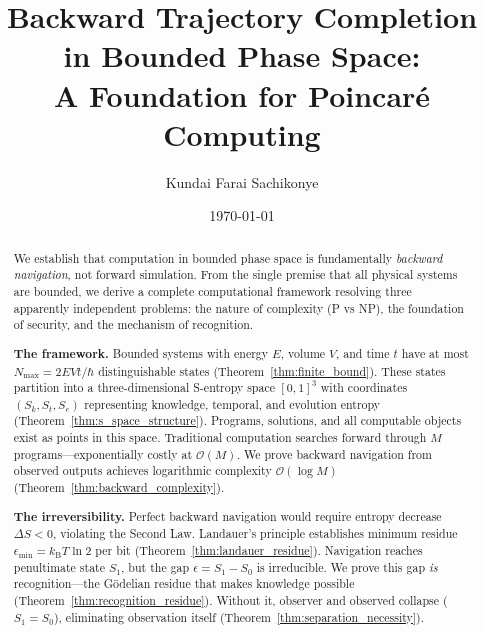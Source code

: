 \documentclass[twocolumn,10pt]{article}
\theoremstyle{definition}
\theoremstyle{remark}
\newcommand{\kB}{k_{\text{B}}}
\newcommand{\Sk}{S_k}
\newcommand{\St}{S_t}
\newcommand{\Se}{S_e}
\newcommand{\bigO}{\mathcal{O}}
\begin{document}
\title{\vspace{-1cm}\textbf{Backward Trajectory Completion in Bounded Phase Space:\\ A Foundation for Poincaré Computing}}

\author[1]{Kundai Farai Sachikonye}

\date{\today}

\maketitle

\begin{abstract}
\noindent We establish that computation in bounded phase space is fundamentally \textit{backward navigation}, not forward simulation. From the single premise that all physical systems are bounded, we derive a complete computational framework resolving three apparently independent problems: the nature of complexity (P vs NP), the foundation of security, and the mechanism of recognition.

\vspace{0.2cm}
\noindent\textbf{The framework.} Bounded systems with energy $E$, volume $V$, and time $t$ have at most $N_{\max} = 2EVt/\hbar$ distinguishable states (Theorem~\ref{thm:finite_bound}). These states partition into a three-dimensional S-entropy space $[0,1]^3$ with coordinates $(\Sk, \St, \Se)$ representing knowledge, temporal, and evolution entropy (Theorem~\ref{thm:s_space_structure}). Programs, solutions, and all computable objects exist as points in this space. Traditional computation searches forward through $M$ programs—exponentially costly at $\bigO(M)$. We prove backward navigation from observed outputs achieves logarithmic complexity $\bigO(\log M)$ (Theorem~\ref{thm:backward_complexity}).

\vspace{0.2cm}
\noindent\textbf{The irreversibility.} Perfect backward navigation would require entropy decrease $\Delta S < 0$, violating the Second Law. Landauer's principle establishes minimum residue $\epsilon_{\min} = \kB T \ln 2$ per bit (Theorem~\ref{thm:landauer_residue}). Navigation reaches penultimate state $S_1$, but the gap $\epsilon = S_1 - S_0$ is irreducible. We prove this gap \textit{is} recognition—the Gödelian residue that makes knowledge possible (Theorem~\ref{thm:recognition_residue}). Without it, observer and observed collapse ($S_1 = S_0$), eliminating observation itself (Theorem~\ref{thm:separation_necessity}).


\end{abstract}
\end{document}
